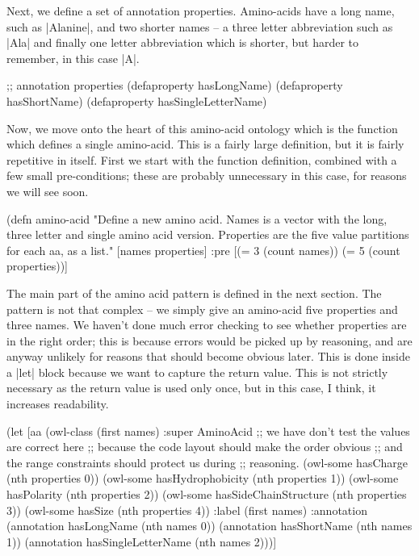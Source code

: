 Next, we define a set of annotation properties. Amino-acids have a long name,
such as |Alanine|, and two shorter names -- a three letter abbreviation such
as |Ala| and finally one letter abbreviation which is shorter, but harder to
remember, in this case |A|.

\begin{tawny}
;; annotation properties
(defaproperty hasLongName)
(defaproperty hasShortName)
(defaproperty hasSingleLetterName)
\end{tawny}

Now, we move onto the heart of this amino-acid ontology which is the function
which defines a single amino-acid. This is a fairly large definition, but it
is fairly repetitive in itself. First we start with the function definition,
combined with a few small pre-conditions; these are probably unnecessary in
this case, for reasons we will see soon.

\begin{tawny}
(defn amino-acid
  "Define a new amino acid. Names is a vector with the long, three letter and
  single amino acid version. Properties are the five value partitions for each
  aa, as a list."
  [names properties]
  {:pre [(= 3 (count names))
         (= 5 (count properties))]}
\end{tawny}

The main part of the amino acid pattern is defined in the next section. The
pattern is not that complex -- we simply give an amino-acid five properties
and three names. We haven't done much error checking to see whether properties
are in the right order; this is because errors would be picked up by
reasoning, and are anyway unlikely for reasons that should become obvious
later. This is done inside a |let| block because we want to capture the return
value. This is not strictly necessary as the return value is used only once,
but in this case, I think, it increases readability.

\begin{tawny}
  (let [aa (owl-class (first names)
                      :super AminoAcid
                      ;; we have don't test the values are correct here
                      ;; because the code layout should make the order obvious
                      ;; and the range constraints should protect us during
                      ;; reasoning.
                      (owl-some hasCharge (nth properties 0))
                      (owl-some hasHydrophobicity (nth properties 1))
                      (owl-some hasPolarity (nth properties 2))
                      (owl-some hasSideChainStructure (nth properties 3))
                      (owl-some hasSize (nth properties 4))
                      :label (first names)
                      :annotation
                      (annotation hasLongName (nth names 0))
                      (annotation hasShortName (nth names 1))
                      (annotation hasSingleLetterName (nth names 2)))]

\end{tawny}

